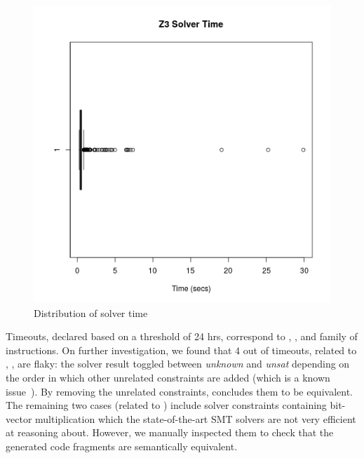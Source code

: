 \begin{figure}
    \includegraphics[scale=0.5]{scalable-validation/figs/solver.png}
    \caption{Distribution of \Z solver time} \label{fig:solvertime}
\end{figure}

Timeouts, declared based on a threshold of 24 hrs, correspond to ,
  , and  family of instructions. On further
  investigation, we found that $4$ out of \sivTO timeouts, related to
  , , are flaky: the \Z solver result toggled between
  \textit{unknown} and \textit{unsat} depending on the order in which other
  unrelated constraints are added (which is a known issue~\cite{ZIssue}). By
  removing the unrelated constraints, \Z concludes them to be equivalent. The
  remaining two cases (related to ) include solver constraints
  containing bit-vector multiplication which the state-of-the-art SMT solvers
  are not very efficient at reasoning about. However, we manually inspected
  them to check that the generated code fragments are semantically equivalent.

